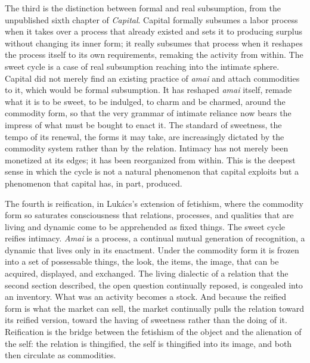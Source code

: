 \documentclass[11pt,a4paper]{article}
\begin{document}
The third is the distinction between formal and real subsumption, from the unpublished sixth chapter of \textit{Capital}. Capital formally subsumes a labor process when it takes over a process that already existed and sets it to producing surplus without changing its inner form; it really subsumes that process when it reshapes the process itself to its own requirements, remaking the activity from within. The sweet cycle is a case of real subsumption reaching into the intimate sphere. Capital did not merely find an existing practice of \textit{amai} and attach commodities to it, which would be formal subsumption. It has reshaped \textit{amai} itself, remade what it is to be sweet, to be indulged, to charm and be charmed, around the commodity form, so that the very grammar of intimate reliance now bears the impress of what must be bought to enact it. The standard of sweetness, the tempo of its renewal, the forms it may take, are increasingly dictated by the commodity system rather than by the relation. Intimacy has not merely been monetized at its edges; it has been reorganized from within. This is the deepest sense in which the cycle is not a natural phenomenon that capital exploits but a phenomenon that capital has, in part, produced.

The fourth is reification, in Lukács's extension of fetishism, where the commodity form so saturates consciousness that relations, processes, and qualities that are living and dynamic come to be apprehended as fixed things. The sweet cycle reifies intimacy. \textit{Amai} is a process, a continual mutual generation of recognition, a dynamic that lives only in its enactment. Under the commodity form it is frozen into a set of possessable things, the look, the items, the image, that can be acquired, displayed, and exchanged. The living dialectic of a relation that the second section described, the open question continually reposed, is congealed into an inventory. What was an activity becomes a stock. And because the reified form is what the market can sell, the market continually pulls the relation toward its reified version, toward the having of sweetness rather than the doing of it. Reification is the bridge between the fetishism of the object and the alienation of the self: the relation is thingified, the self is thingified into its image, and both then circulate as commodities.
\end{document}
